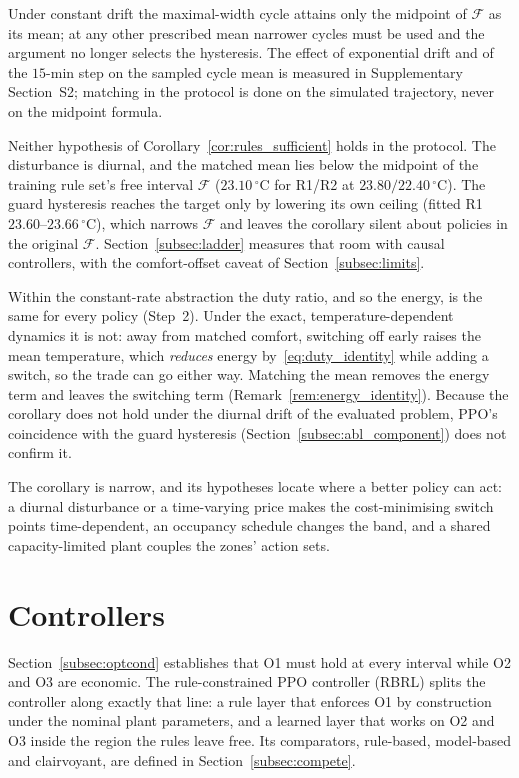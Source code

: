 \documentclass[3p,twocolumn,number]{elsarticle}
\begin{document}
Under constant drift the maximal-width cycle attains only the midpoint of $\mathcal{F}$ as its mean; at any other prescribed mean narrower cycles must be used and the argument no longer selects the hysteresis. The effect of exponential drift and of the $15$-min step on the sampled cycle mean is measured in Supplementary Section~S2; matching in the protocol is done on the simulated trajectory, never on the midpoint formula.

\begin{remark}
\label{rem:cor_scope}
Neither hypothesis of Corollary~\ref{cor:rules_sufficient} holds in the protocol. The disturbance is diurnal, and the matched mean lies below the midpoint of the training rule set's free interval $\mathcal{F}$ ($23.10\,^\circ$C for R1/R2 at $23.80/22.40\,^\circ$C). The guard hysteresis reaches the target only by lowering its own ceiling (fitted R1 $23.60$--$23.66\,^\circ$C), which narrows $\mathcal{F}$ and leaves the corollary silent about policies in the original $\mathcal{F}$. Section~\ref{subsec:ladder} measures that room with causal controllers, with the comfort-offset caveat of Section~\ref{subsec:limits}.
\end{remark}

Within the constant-rate abstraction the duty ratio, and so the energy, is the same for every policy (Step~2). Under the exact, temperature-dependent dynamics it is not: away from matched comfort, switching off early raises the mean temperature, which \emph{reduces} energy by~\eqref{eq:duty_identity} while adding a switch, so the trade can go either way. Matching the mean removes the energy term and leaves the switching term (Remark~\ref{rem:energy_identity}). Because the corollary does not hold under the diurnal drift of the evaluated problem, PPO's coincidence with the guard hysteresis (Section~\ref{subsec:abl_component}) does not confirm it.

The corollary is narrow, and its hypotheses locate where a better policy can act: a diurnal disturbance or a time-varying price makes the cost-minimising switch points time-dependent, an occupancy schedule changes the band, and a shared capacity-limited plant couples the zones' action sets.

 
\section{Controllers}
\label{sec:method}

Section~\ref{subsec:optcond} establishes that O1 must hold at every interval while O2 and O3 are economic. The rule-constrained PPO controller (RBRL) splits the controller along exactly that line: a rule layer that enforces O1 by construction under the nominal plant parameters, and a learned layer that works on O2 and O3 inside the region the rules leave free. Its comparators, rule-based, model-based and clairvoyant, are defined in Section~\ref{subsec:compete}.
 
\end{document}
